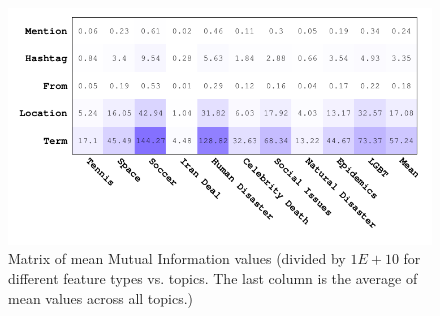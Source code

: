 
\begin{figure}[t!]
\centering
\includegraphics[width=\columnwidth]{images/avgMI_gray2.pdf}
\caption{Matrix of mean Mutual Information values (divided by $1E+10$ for different feature types vs. topics.  The last column is the average of mean values across all topics.)}
\label{fig:avgMI}
\end{figure}


